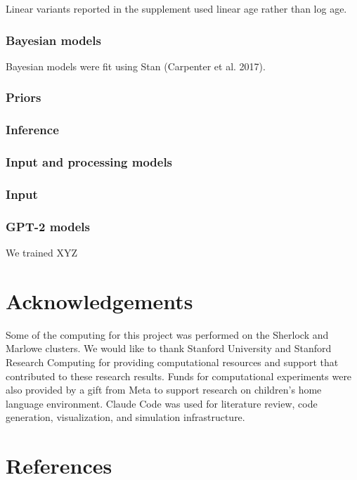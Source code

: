 \documentclass[
  11pt,
]{article}
\begin{document}
Linear variants reported in the supplement used linear age rather than
log age.

\subsubsection{Bayesian models}\label{bayesian-models}

Bayesian models were fit using Stan (Carpenter et al. 2017).

\subsubsection{Priors}\label{priors}

\subsubsection{Inference}\label{inference}

\subsubsection{Input and processing
models}\label{input-and-processing-models}

\subsubsection{Input}\label{input}

\subsubsection{GPT-2 models}\label{gpt-2-models}

We trained XYZ

\section{Acknowledgements}\label{acknowledgements}

Some of the computing for this project was performed on the Sherlock and
Marlowe clusters. We would like to thank Stanford University and
Stanford Research Computing for providing computational resources and
support that contributed to these research results. Funds for
computational experiments were also provided by a gift from Meta to
support research on children's home language environment. Claude Code
was used for literature review, code generation, visualization, and
simulation infrastructure.

\section{References}\label{references}
\end{document}
